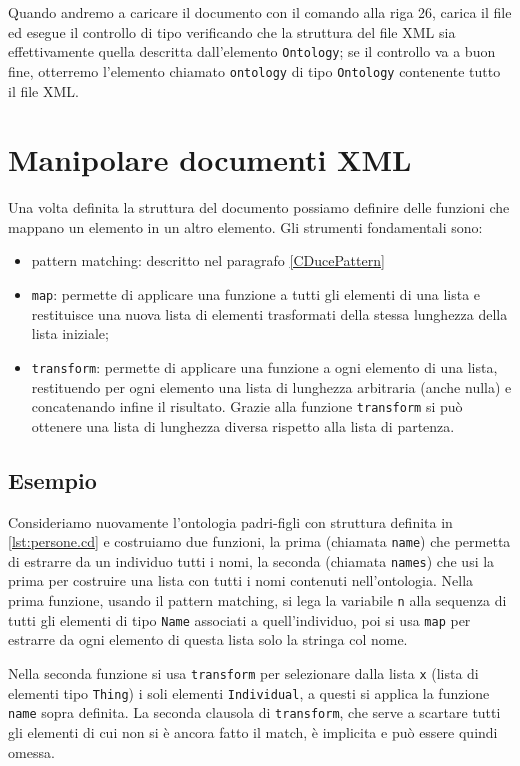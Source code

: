 Quando andremo a caricare il documento con il comando alla riga 26, \cduce carica il file ed esegue il controllo di tipo verificando che la struttura del file XML sia effettivamente quella descritta dall'elemento \verb|Ontology|; se il controllo va a buon fine, otterremo l'elemento chiamato \verb|ontology| di tipo \verb|Ontology| contenente tutto il file XML.
\section{Manipolare documenti XML}
Una volta definita la struttura del documento possiamo definire delle funzioni che mappano un elemento in un altro elemento. Gli strumenti fondamentali sono:
\begin{itemize}
	\item pattern matching: descritto nel paragrafo \ref{CDucePattern}
	\item \verb|map|\label{map}: permette di applicare una funzione a tutti gli elementi di una lista e restituisce una nuova lista di elementi trasformati della stessa lunghezza della lista iniziale;
	\item \verb|transform|: permette di applicare una funzione a ogni elemento di una lista, restituendo per ogni elemento una lista di lunghezza arbitraria (anche nulla) e concatenando infine il risultato. Grazie alla funzione \verb|transform| si può ottenere una lista di lunghezza diversa rispetto alla lista di partenza.
\end{itemize}

\subsection{Esempio}
Consideriamo nuovamente l'ontologia padri-figli con struttura definita in \ref{lst:persone.cd} e costruiamo due funzioni, la prima (chiamata \verb|name|) che permetta di estrarre da un individuo tutti i nomi, la seconda (chiamata \verb|names|) che usi la prima per costruire una lista con tutti i nomi contenuti nell'ontologia.
Nella prima funzione, usando il pattern matching, si lega la variabile \verb|n| alla sequenza di tutti gli elementi di tipo \verb|Name| associati a quell'individuo, poi si usa \verb|map| per estrarre da ogni elemento di questa lista solo la stringa col nome.

Nella seconda funzione si usa \verb|transform| per selezionare dalla lista \verb|x| (lista di elementi tipo \verb|Thing|) i soli elementi \verb|Individual|, a questi si applica la funzione \verb|name| sopra definita. La seconda clausola di \verb|transform|, che serve a scartare tutti gli elementi di cui non si è ancora fatto il match, è implicita e può essere quindi omessa.

